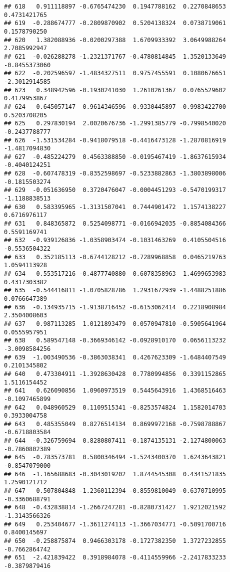 \documentclass[
]{article}
\begin{document}
\begin{verbatim}
## 618   0.911118897 -0.6765474230  0.1947788162  0.2270848653  0.4731421765
## 619  -0.288674777 -0.2809870902  0.5204138324  0.0738719061  0.1578790250
## 620   1.382088936 -0.0200297388  1.6709933392  3.0649988264  2.7085992947
## 621  -0.026288278 -1.2321371767 -0.4780814845  1.3520133649 -0.8455373060
## 622  -0.202596597 -1.4834327511  0.9757455591  0.1080676651 -2.3012914585
## 623   0.348942596 -0.1930241030  1.2610261367  0.0765529602  0.4179953867
## 624   0.645057147  0.9614346596 -0.9330445897 -0.9983422700  0.5203708205
## 625   0.297830194  2.0020676736 -1.2991385779 -0.7998540020 -0.2437788777
## 626  -1.531534284 -0.9418079518 -0.4416473128 -1.2870816919 -1.4817094830
## 627  -0.485224279  0.4563388850 -0.0195467419 -1.8637615934 -0.4040124251
## 628  -0.607478319 -0.8352598697 -0.5233882863 -1.3803898006 -0.1815503274
## 629  -0.051636950  0.3720476047 -0.0004451293 -0.5470199317 -1.1188838513
## 630   0.583395965 -1.3131507041  0.7444901472  1.1574138227  0.6716976117
## 631   0.848365872  0.5254098771 -0.0166942035 -0.8854084366  0.5591169741
## 632  -0.939126836 -1.0358903474 -0.1031463269  0.4105504516 -0.5536504322
## 633   0.352185113 -0.6744128212 -0.7289968858  0.0465219763  1.0594113928
## 634   0.553517216 -0.4877740880  0.6078358963  1.4699653983  0.4317303382
## 635  -0.544416811 -1.0705828786  1.2931672939 -1.4488251886  0.0766647389
## 636  -0.134935715 -1.9138716452 -0.6153062414  0.2218908984  2.3504008603
## 637   0.987113285  1.0121893479  0.0570947810 -0.5905641964  0.0555957951
## 638   0.589547148 -0.3669346142 -0.0928910170  0.0656113232 -3.0098584256
## 639  -1.003490536 -0.3863038341  0.4267623309 -1.6484407549  0.2101345802
## 640   0.473304911 -1.3928630428  0.7780994856  0.3391152865  1.5116154452
## 641   0.626090856  1.0960973519  0.5445643916  1.4368516463 -0.1097465899
## 642   0.048960529  0.1109515341 -0.8253574824  1.1582014703  0.3933004758
## 643   0.485355049  0.8276514134  0.8699972168 -0.7598788867 -0.6718803584
## 644  -0.326759694  0.8280807411 -0.1874135131 -2.1274800063 -0.7860802389
## 645  -0.783573781  0.5800346494 -1.5243400370  1.6243643821 -0.8547079000
## 646  -1.165688683 -0.3043019202  1.8744545308  0.4341521835  1.2590121712
## 647   0.507804848 -1.2360112394 -0.8559810049 -0.6370710995 -0.3360688791
## 648  -0.432838814 -1.2667247281 -0.8280731427  1.9212021592 -1.3143566326
## 649   0.253404677 -1.3611274113 -1.3667034771 -0.5091700716  0.8400145697
## 650  -0.258875874  0.9466303178 -0.1727382350  1.3727232855 -0.7662864742
## 651  -2.421839422  0.3918984078 -0.4114559966 -2.2417833233 -0.3879879416

\end{verbatim}
\end{document}
